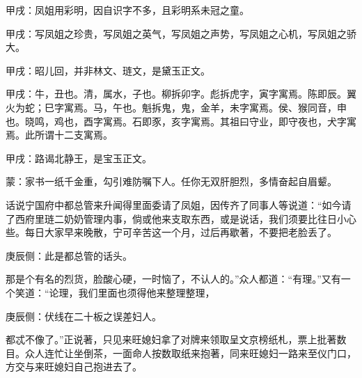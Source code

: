 
\begin{parag}
    \begin{note}甲戌：凤姐用彩明，因自识字不多，且彩明系未冠之童。\end{note}
\end{parag}


\begin{parag}
    \begin{note}甲戌：写凤姐之珍贵，写凤姐之英气，写凤姐之声势，写凤姐之心机，写凤姐之骄大。\end{note}
\end{parag}


\begin{parag}
    \begin{note}甲戌：昭儿回，并非林文、琏文，是黛玉正文。\end{note}
\end{parag}


\begin{parag}
    \begin{note}甲戌：牛，丑也。清，属水，子也。柳拆卯字。彪拆虎字，寅字寓焉。陈即辰。翼火为蛇；巳字寓焉。马，午也。魁拆鬼，鬼，金羊，未字寓焉。侯、猴同音，申也。晓鸣，鸡也，酉字寓焉。石即豕，亥字寓焉。其祖曰守业，即守夜也，犬字寓焉。此所谓十二支寓焉。\end{note}
\end{parag}


\begin{parag}
    \begin{note}甲戌：路谒北静王，是宝玉正文。\end{note}
\end{parag}


\begin{parag}
    \begin{note}蒙：家书一纸千金重，勾引难防嘱下人。任你无双肝胆烈，多情奋起自眉颦。\end{note}
\end{parag}


\begin{parag}
    话说宁国府中都总管来升闻得里面委请了凤姐，因传齐了同事人等说道：“如今请了西府里琏二奶奶管理内事，倘或他来支取东西，或是说话，我们须要比往日小心些。每日大家早来晚散，宁可辛苦这一个月，过后再歇著，不要把老脸丢了。\begin{note}庚辰侧：此是都总管的话头。\end{note}那是个有名的烈货，脸酸心硬，一时恼了，不认人的。”众人都道：“有理。”又有一个笑道：“论理，我们里面也须得他来整理整理，\begin{note}庚辰侧：伏线在二十板之误差妇人。\end{note}都忒不像了。”正说著，只见来旺媳妇拿了对牌来领取呈文京榜纸札，票上批著数目。众人连忙让坐倒茶，一面命人按数取纸来抱著，同来旺媳妇一路来至仪门口，方交与来旺媳妇自己抱进去了。
\end{parag}



